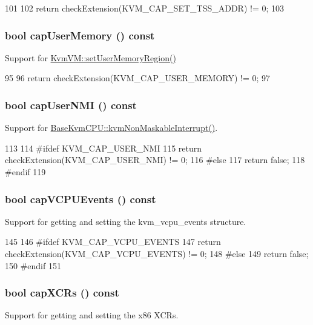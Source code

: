 \begin{DoxyCode}
101 {
102     return checkExtension(KVM_CAP_SET_TSS_ADDR) != 0;
103 }
\end{DoxyCode}
\hypertarget{classKvm_a3f08fc1c466eca4129d52fa3b21023d1}{
\subsubsection[{capUserMemory}]{\setlength{\rightskip}{0pt plus 5cm}bool capUserMemory () const}}
\label{classKvm_a3f08fc1c466eca4129d52fa3b21023d1}
Support for \hyperlink{classKvmVM_a2d2ed492c91fc674db226f86fae39127}{KvmVM::setUserMemoryRegion()} 


\begin{DoxyCode}
95 {
96     return checkExtension(KVM_CAP_USER_MEMORY) != 0;
97 }
\end{DoxyCode}
\hypertarget{classKvm_acf36e247bf7857c1c7b1e260eff7f7db}{
\subsubsection[{capUserNMI}]{\setlength{\rightskip}{0pt plus 5cm}bool capUserNMI () const}}
\label{classKvm_acf36e247bf7857c1c7b1e260eff7f7db}
Support for \hyperlink{group__KvmInterrupts_gabc700469cba2d4bba666902e552e7c2e}{BaseKvmCPU::kvmNonMaskableInterrupt()}. 


\begin{DoxyCode}
113 {
114 #ifdef KVM_CAP_USER_NMI
115     return checkExtension(KVM_CAP_USER_NMI) != 0;
116 #else
117     return false;
118 #endif
119 }
\end{DoxyCode}
\hypertarget{classKvm_a75f29a9991c1117d5182abfb23bfbc92}{
\subsubsection[{capVCPUEvents}]{\setlength{\rightskip}{0pt plus 5cm}bool capVCPUEvents () const}}
\label{classKvm_a75f29a9991c1117d5182abfb23bfbc92}
Support for getting and setting the kvm\_\-vcpu\_\-events structure. 


\begin{DoxyCode}
145 {
146 #ifdef KVM_CAP_VCPU_EVENTS
147     return checkExtension(KVM_CAP_VCPU_EVENTS) != 0;
148 #else
149     return false;
150 #endif
151 }
\end{DoxyCode}
\hypertarget{classKvm_aa9b34836edde016c16df3006fb33b0a9}{
\subsubsection[{capXCRs}]{\setlength{\rightskip}{0pt plus 5cm}bool capXCRs () const}}
\label{classKvm_aa9b34836edde016c16df3006fb33b0a9}
Support for getting and setting the x86 XCRs. 



